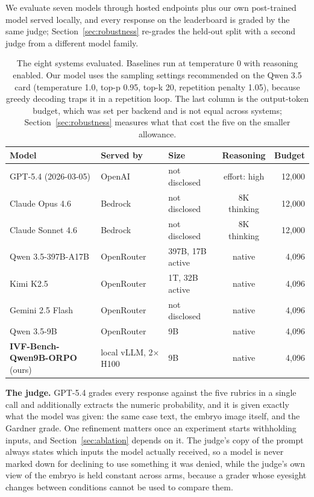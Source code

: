 
We evaluate seven models through hosted endpoints plus our own post-trained
model served locally, and every response on the leaderboard is graded by the same
judge; Section~\ref{sec:robustness} re-grades the held-out split with a second
judge from a different model family.

\begin{table}[H]
\centering
\small
\setlength{\tabcolsep}{4pt}
\begin{tabular}{lllcr}
\toprule
\textbf{Model} & \textbf{Served by} & \textbf{Size} & \textbf{Reasoning} & \textbf{Budget} \\
\midrule
GPT-5.4 (2026-03-05) & OpenAI & not disclosed & effort: high & 12,000 \\
Claude Opus 4.6 & Bedrock & not disclosed & 8K thinking & 12,000 \\
Claude Sonnet 4.6 & Bedrock & not disclosed & 8K thinking & 12,000 \\
Qwen 3.5-397B-A17B & OpenRouter & 397B, 17B active & native & 4,096 \\
Kimi K2.5 & OpenRouter & 1T, 32B active & native & 4,096 \\
Gemini 2.5 Flash & OpenRouter & not disclosed & native & 4,096 \\
Qwen 3.5-9B & OpenRouter & 9B & native & 4,096 \\
\midrule
\textbf{IVF-Bench-Qwen9B-ORPO} (ours) & local vLLM, 2$\times$H100 & 9B & native & 4,096 \\
\bottomrule
\end{tabular}
\caption{The eight systems evaluated. Baselines run at temperature 0 with
reasoning enabled. Our model uses the sampling settings recommended on the Qwen
3.5 card (temperature 1.0, top-p 0.95, top-k 20, repetition penalty 1.05),
because greedy decoding traps it in a repetition loop. The last column is the
output-token budget, which was set per backend and is not equal across systems;
Section~\ref{sec:robustness} measures what that cost the five on the smaller
allowance.}
\label{tab:models}
\end{table}

\textbf{The judge.} GPT-5.4 grades every response against the five rubrics in a
single call and additionally extracts the numeric probability, and it is given
exactly what the model was given: the same case text, the embryo image itself,
and the Gardner grade. One refinement matters once an experiment starts
withholding inputs, and Section~\ref{sec:ablation} depends on it. The judge's
copy of the prompt always states which inputs the model actually received, so a
model is never marked down for declining to use something it was denied, while
the judge's own view of the embryo is held constant across arms, because a grader
whose eyesight changes between conditions cannot be used to compare them.

